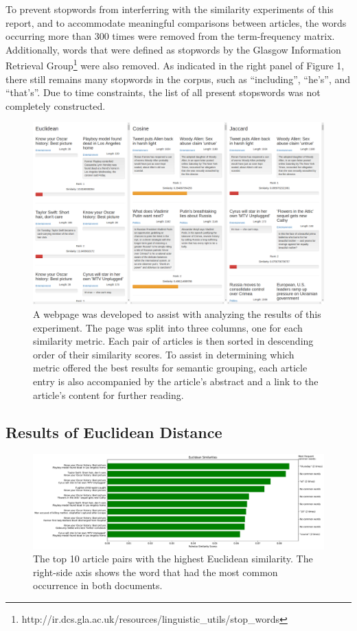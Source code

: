 \documentclass[11pt]{article}
\begin{document}
To prevent stopwords from interferring with the similarity experiments of this report, and to accommodate meaningful comparisons between articles, the words occurring more than 300 times were removed from the term-frequency matrix.
Additionally, words that were defined as stopwords by the Glasgow Information
Retrieval Group\footnote{http://ir.dcs.gla.ac.uk/resources/linguistic\_utils/stop\_words} were also removed.
As indicated in the right panel of Figure 1, there still remains many stopwords in the corpus, such as ``including'', ``he's'', and ``that's''.
Due to time constraints, the list of all present stopswords was not completely constructed.


\begin{figure}[h] \label{fig:website}
  \centering
  \includegraphics[width=\textwidth]{figures/webpage}
  \caption{A webpage was developed to assist with analyzing the results of this experiment.
  The page was split into three columns, one for each similarity metric.
  Each pair of articles is then sorted in descending order of their similarity scores.
  To assist in determining which metric offered the best results for semantic grouping, each article entry is also accompanied by the article's abstract and a link to the article's content for further reading.}
\end{figure}

\subsection{Results of Euclidean Distance}

\begin{figure}[h] \label{fig:euclid}
  \centering
  \includegraphics[width=\textwidth]{figures/euclidean_most_sim}
  \caption{The top 10 article pairs with the highest Euclidean similarity.
  The right-side axis shows the word that had the most common occurrence in both documents.}
\end{figure}
\end{document}
